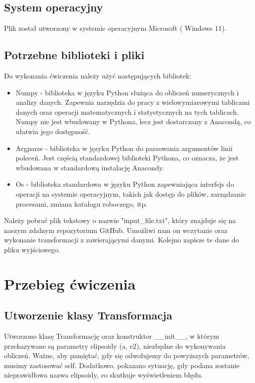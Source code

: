 \documentclass[10pt,a4paper]{article}
\begin{document}
	\subsection{System operacyjny}
	
	Plik został utworzony w systemie operacyjnym Microsoft ( Windows 11).
	
	\subsection{Potrzebne biblioteki i pliki}
	
	Do wykonania ćwiczenia należy użyć następujących bibliotek:
	\begin{itemize}

	\item Numpy - biblioteka w języku Python służąca do obliczeń numerycznych i analizy danych. Zapewnia narzędzia do pracy z wielowymiarowymi tablicami danych oraz operacji matematycznych i statystycznych na tych tablicach. Numpy nie jest wbudowany w Pythona, lecz jest dostarczany z Anacondą, co ułatwia jego dostępność.
	\item Argparse - biblioteka w języku Python do parsowania argumentów linii poleceń. Jest częścią standardowej biblioteki Pythona, co oznacza, że jest wbudowana w standardową instalację Anacondy.
	\item Os - biblioteka standardowa w języku Python zapewniająca interfejs do operacji na systemie operacyjnym, takich jak dostęp do plików, zarządzanie procesami, zmiana katalogu roboczego, itp.	
		
	\end{itemize}
	Należy pobrać plik tekstowy o nazwie "input\_{}file.txt", który znajduje się na naszym zdalnym repozytorium GitHub. Umożliwi nam on wczytanie oraz wykonanie transformacji z zawierającymi danymi. Kolejno zapisze te dane do pliku wyjściowego.
	\section{Przebieg ćwiczenia}
	
	\subsection{Utworzenie klasy Transformacja}
	Utworzono klasę Transformację oraz konstruktor \_{}\_{}init\_{}\_{}, w którym przekazywane są parametry elipsoidy (a, e2), niezbędne do wykonywania obliczeń. Ważne, aby pamiętać, gdy się odwołujemy do powyższych parametrów, musimy zastosować self. Dodatkowo, pokazano sytuację, gdy podana zostanie nieprawidłowa nazwa elipsoidy, co skutkuje wyświetleniem błędu. 
	
\end{document}
